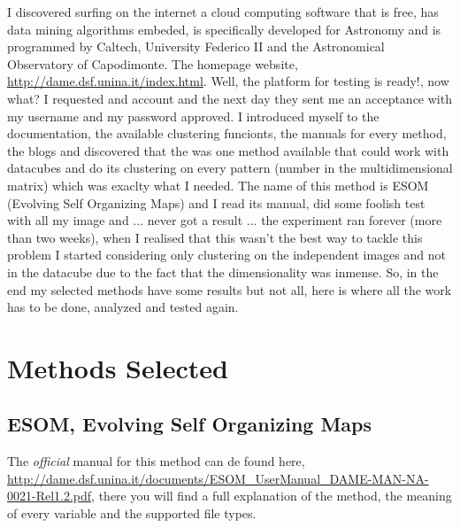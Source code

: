 \documentclass[11pt,fleqn]{book} %
\begin{document}
																																																																																																																																																																																																																					    I discovered surfing on the internet a cloud computing software that is free, has data mining algorithms embeded, is specifically developed for Astronomy and is programmed by Caltech, University Federico II and the Astronomical Observatory of Capodimonte. The homepage website, \url{http://dame.dsf.unina.it/index.html}. Well, the platform for testing is ready!, now what? I requested and account and the next day they sent me an acceptance with my username and my password approved.
																																																																																																																																																																																																																					    I introduced myself to the documentation, the available clustering funcionts, the manuals for every method, the blogs and discovered that the was one method available that could work with datacubes and do its clustering on every pattern (number in the multidimensional matrix) which was exaclty what I needed. The name of this method is ESOM (Evolving Self Organizing Maps) and I read its manual, did some foolish test with all my image and ... never got a result ... the experiment ran forever (more than two weeks), when I realised that this wasn't the best way to tackle this problem I started considering only clustering on the independent images and not in the datacube due to the fact that the dimensionality was inmense. So, in the end my selected methods have some results but not all, here is where all the work has to be done, analyzed and tested again.

																																																																																																																																																																																																																					    \section{Methods Selected}

																																																																																																																																																																																																																					    \subsection{ESOM, Evolving Self Organizing Maps}
																																																																																																																																																																																																																					    The \emph{official} manual for this method can de found here, \url{http://dame.dsf.unina.it/documents/ESOM_UserManual_DAME-MAN-NA-0021-Rel1.2.pdf}, there you will find a full explanation of the method, the meaning of every variable and the supported file types.
\end{document}

